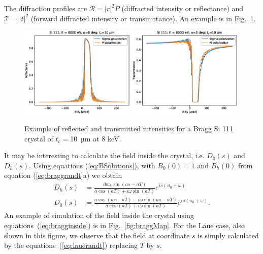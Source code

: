 \documentclass[preprint]{iucr}              %
\newcommand{\inblue}[1]{{\color{blue}#1}}
\newcommand{\inred}[1]{{\color{red}#1}}
\begin{document}
The diffraction profiles are $\mathcal{R}=|r|^2 P$ (diffracted intensity or reflectance) and $\mathcal{T}=|t|^2$ (forward diffracted intensity or transmittance).
An example is in Fig.~\ref{fig:braggProfiles}. 

\begin{figure}\label{fig:braggProfiles}
    \centering
    \includegraphics[width=0.49\textwidth]{figures/Bragg_1.eps}
    \includegraphics[width=0.49\textwidth]{figures/Bragg_2.eps}
    \caption{Example of reflected and transmitted intensities for a Bragg Si 111 crystal of $t_c=$\SI{10}{\micro\meter} at 8 keV. }
\end{figure}

\inred{
It may be interesting to calculate the field inside the crystal, i.e. $D_0(s)$ and $D_h(s)$. Using equations (\ref{eq:BSolutions}), with $B_0(0)=1$ and $B_h(0)$ from equation (\ref{eq:braggrandt}a) we obtain
\begin{subequations}\label{eq:bragginside}
\begin{align}
D_h(s)&=\frac{i b u_h \sin(as - aT)}{a \cos(aT) + i \omega \sin(aT)} e^{is(u_0+\omega)}\\
D_0(s)&= \frac{a \cos(as-aT) - i \omega \sin(as-aT)}{a \cos(aT) + i \omega \sin(aT)} e^{is(u_0+\omega)}.
\end{align}
\end{subequations}
}
\inblue{
An example of simulation of the field inside the crystal using equations~(\ref{eq:bragginside}) is in Fig.~\ref{fig:braggMap}. For the Laue case, also shown in this figure, we observe that the field at coordinate $s$ is simply calculated by the equations~(\ref{eq:lauerandt}) replacing $T$ by $s$. 
}
\end{document}
